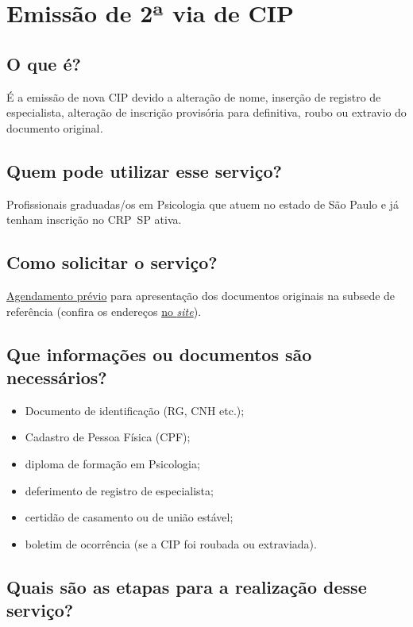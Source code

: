 \chapter{Emissão de 2ª via de CIP}
\label{chap:pf-2-via}

\section{O que é?}

É a emissão de nova CIP devido a alteração de nome, inserção de registro
de especialista, alteração de inscrição provisória para definitiva,
roubo ou extravio do documento original\emph{.}

\section{Quem pode utilizar esse serviço?}

Profissionais graduadas/os em Psicologia que atuem no estado de São Paulo e já tenham inscrição no CRP~SP ativa.

\section{Como solicitar o serviço?}

\href{https://www.crpsp.org/agendamento}{Agendamento prévio} para apresentação dos documentos originais na subsede de referência (confira
os endereços \href{https://www.crpsp.org/sede/index}{no \emph{site}}).

\section{Que informações ou documentos são necessários?}

\begin{itemize}
	\item
	Documento de identificação (RG, CNH etc.);
	\item
	Cadastro de Pessoa Física (CPF);
	\item
	diploma de formação em Psicologia;
	\item
	deferimento de registro de especialista;
	\item
	certidão de casamento ou de união estável;
	\item
	boletim de ocorrência (se a CIP foi roubada ou extraviada).
\end{itemize}

\section{Quais são as etapas para a realização desse serviço?}

